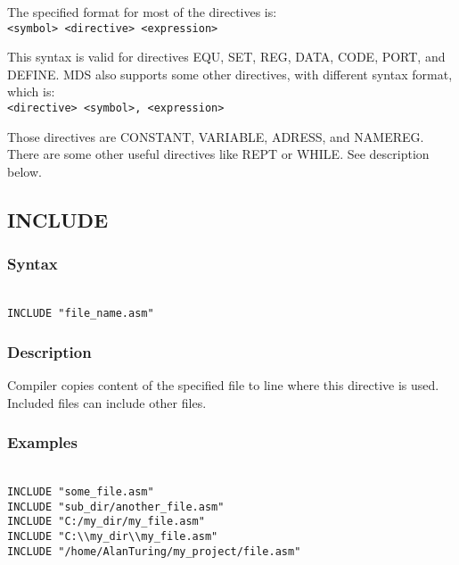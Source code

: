     The specified format for most of the directives is:
    {
        ~\\
        \usecodefont
        \verb'<symbol> <directive> <expression>'
    }

    \bigskip

    This syntax is valid for directives EQU, SET, REG, DATA, CODE, PORT, and DEFINE. MDS also supports some other directives, with different syntax format, which is:
    {
        ~\\
        \usecodefont
        \verb'<directive> <symbol>, <expression>'
    }

    \bigskip

    Those directives are CONSTANT, VARIABLE, ADRESS, and NAMEREG. There are some other useful directives like REPT or WHILE. See description below.

    \clearpage
    \subsection{INCLUDE}
        \subsubsection{Syntax}
        {
            ~\\
            \usecodefont
            \verb'INCLUDE "file_name.asm"'
        }
        \subsubsection{Description}
            Compiler copies content of the specified file to line where this directive is used. Included files can include other files.

        \subsubsection{Examples}
        {
            ~\\
            \usecodefont
            \verb'INCLUDE "some_file.asm"'\\
            \verb'INCLUDE "sub_dir/another_file.asm"'\\
            \verb'INCLUDE "C:/my_dir/my_file.asm"'\\
            \verb'INCLUDE "C:\\my_dir\\my_file.asm"'\\
            \verb'INCLUDE "/home/AlanTuring/my_project/file.asm"'\\
        }

